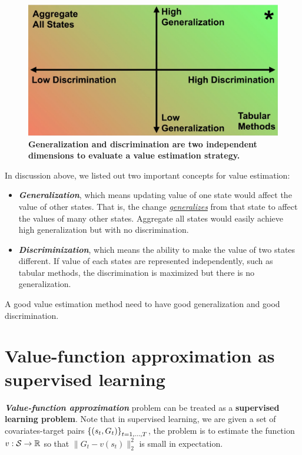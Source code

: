 \documentclass[11pt]{article}
\begin{document}
\begin{figure}
\begin{minipage}[t]{1\linewidth}
  \centering
  \centerline{\includegraphics[scale = 0.2]{generalization_discrimination.png}}
\end{minipage}
\caption{\footnotesize{\textbf{Generalization and discrimination are two independent dimensions to evaluate a value estimation strategy.}}}
\label{fig: generalization_discrimination}
\end{figure}

In discussion above, we listed out two important concepts for value estimation:
\begin{itemize}
\item  \textbf{\emph{Generalization}}, which means updating value of one state would affect the value of other states. That is, the change \emph{\underline{generalizes}} from that state to affect the values of many other states. Aggregate all states would easily achieve high generalization but with no discrimination. 

\item \textbf{\emph{Discriminization}}, which means the ability to make the value of two states different. If value of each states are represented independently, such as tabular methods, the discrimination is maximized but there is no generalization. 
\end{itemize} A good value estimation method need to have good generalization and good discrimination. 

\section{Value-function approximation as supervised learning}
\emph{\textbf{Value-function approximation}} problem can be treated as a \textbf{supervised learning problem}. Note that in supervised learning, we are given a set of covariates-target pairs $\left\{(s_{t}, G_{t})\right\}_{t=1, \ldots, T}$, the problem is to estimate the function $v: {\mathcal S} \rightarrow {\mathbb R}$ so that $\| G_{t} - v(s_{t})\|_{2}^{2}$ is small in expectation. 
\end{document}
